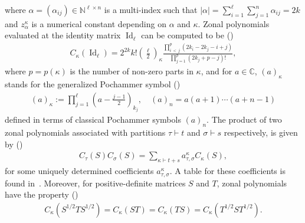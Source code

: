 \documentclass[10pt]{amsart}
\theoremstyle{definition}\newtheorem{defi}[theo]{Definition}\newtheorem{rema}[theo]{Remark}\newtheorem{exam}[theo]{Example}\newtheorem{exem}[theo]{Example}\newtheorem{nota}[theo]{Notation}
\DeclareMathOperator{\Id}{Id}
\newcommand{\N}{\mathbb{N}}
\newcommand{\C}{\mathbb{C}}
\begin{document}
where $\alpha=(\alpha_{ij}) \in \N^{\ell \times n}$ is a multi-index such that $|\alpha|=\sum_{i=1}^{\ell}\sum_{j=1}^n \alpha_{ij}=2k$ and $z_{\alpha}^{\kappa}$ is a numerical constant depending on $\alpha$ and $\kappa$. Zonal polynomials evaluated at the identity matrix $\Id_{\ell}$ can be computed to be (\cite[Eq.(A.2.7)]{Ch2012})
\begin{gather*}
C_{\kappa}(\Id_{\ell}) = 2^{2k}k! \left(\frac{\ell}{2}\right)_{\kappa}
\frac{\prod_{i\,<\,j}^p (2k_i-2k_j-i+j)}{\prod_{j=1}^p (2k_j+p-j)!},
\end{gather*}
where $p=p(\kappa)$ is the number of non-zero parts in $\kappa$, and for $a \in \C$, $(a)_{\kappa} $ stands for the generalized Pochammer symbol (\cite[Eq.~(A.2.4)]{Ch2012})
\begin{gather}\label{PochGen}
(a)_{\kappa} := \prod_{j=1}^{\ell} \left(a-\frac{j-1}{2}\right)_{k_j}, \quad (a)_{n} = a(a+1)\cdots(a+n-1)
\end{gather}
defined in terms of classical Pochammer symbols $(a)_n$. The product of two zonal polynomials associated with partitions $\tau \vdash t$ and $\sigma \vdash s$ respectively, is given by (\cite[Eq.~(4.3.65)]{BFZP})
\begin{gather}\label{akt}
C_{\tau}(S) C_{\sigma}(S) = \sum_{\kappa \vdash t+s} a_{\tau,\sigma}^{\kappa} C_{\kappa}(S),
\end{gather}
for some uniquely determined coefficients $a_{\tau,\sigma}^{\kappa}$. A table for these coefficients is found in~\cite[Table~4.3.2(a)]{BFZP}. Moreover, for positive-definite matrices $S$ and $T$, zonal polynomials have the property (\cite[Eq.~(4.3.18)]{BFZP})
\begin{gather}\label{Inv}
C_{\kappa}\left(S^{1/2}TS^{1/2}\right)=C_{\kappa}(ST)=C_{\kappa}(TS)=C_{\kappa}\left(T^{1/2}ST^{1/2}\right).
\end{gather}
\end{document}
